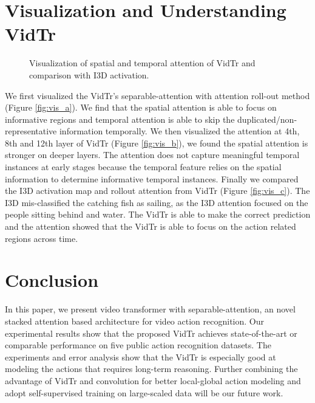 \documentclass[10pt,twocolumn,letterpaper]{article}
\begin{document}
\section{Visualization and Understanding VidTr}
\begin{figure}[t]
\begin{center}
	\hfill
	\hfill 
	\caption{Visualization of spatial and temporal attention of VidTr and comparison with I3D activation. 
	}
\end{center}
\end{figure}
We first visualized the VidTr's separable-attention with attention roll-out method \cite{abnar2020quantifying} (Figure \ref{fig:vis_a}). We find that the spatial attention is able to focus on informative regions and temporal attention is able to skip the duplicated/non-representative information temporally.
We then visualized the attention at 4th, 8th and 12th layer of VidTr (Figure \ref{fig:vis_b}), 
we found the spatial attention is stronger on deeper layers.
The attention does not capture meaningful temporal instances at early stages because the temporal feature relies on the spatial information to determine informative temporal instances. 
Finally we compared the I3D activation map and rollout attention from VidTr (Figure \ref{fig:vis_c}). The I3D mis-classified the catching fish as sailing, as the I3D attention focused on the people sitting behind and water. The VidTr is able to make the correct prediction and the attention showed that the VidTr is able to focus on the action related regions across time.
 
\section{Conclusion}
In this paper, we present video transformer with separable-attention, an novel stacked attention based architecture for video action recognition.
Our experimental results show that the proposed VidTr achieves state-of-the-art or comparable performance on five public action recognition datasets. 
The experiments and error analysis show that the VidTr is especially good at modeling the actions that requires long-term reasoning.
Further combining the advantage of VidTr and convolution for better local-global action modeling \cite{wu2021cvt,liu2021swin} and adopt self-supervised training \cite{chen2021empirical} on large-scaled data will be our future work.\\
 
{\small


}
\end{document}
